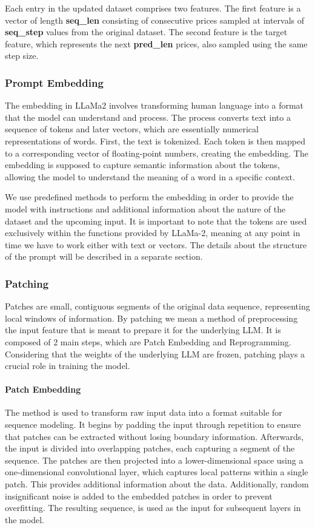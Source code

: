 Each entry in the updated dataset comprises two features. The first feature is a vector of length \textbf{seq\_len} consisting of consecutive prices sampled at intervals of \textbf{seq\_step} values from the original dataset. The second feature is the target feature, which represents the next \textbf{pred\_len} prices, also sampled using the same step size.

\subsubsection*{Prompt Embedding}
The embedding in LLaMa2 involves transforming human language into a format that the model can understand and process. The process converts text into a sequence of tokens and later vectors, which are essentially numerical representations of words. First, the text is tokenized. Each token is then mapped to a corresponding vector of floating-point numbers, creating the embedding. The embedding is supposed to capture semantic information about the tokens, allowing the model to understand the meaning of a word in a specific context.

We use predefined methods to perform the embedding in order to provide the model with instructions and additional information about the nature of the dataset and the upcoming input. It is important to note that the tokens are used exclusively within the functions provided by LLaMa-2, meaning at any point in time we have to work either with text or vectors.  The details about the structure of the prompt will be described in a separate section.
\subsubsection*{Patching}
Patches are small, contiguous segments of the original data sequence, representing local windows of information. By patching we mean a method of preprocessing the input feature that is meant to prepare it for the underlying LLM. It is composed of 2 main steps, which are Patch Embedding and Reprogramming. Considering that the weights of the underlying LLM are frozen, patching plays a crucial role in training the model.

\paragraph{Patch Embedding}
The method is used to transform raw input data into a format suitable for sequence modeling. It begins by padding the input through repetition to ensure that patches can be extracted without losing boundary information. Afterwards, the input is divided into overlapping patches, each capturing a segment of the sequence. The patches are then projected into a lower-dimensional space using a one-dimensional convolutional layer, which captures local patterns within a single patch. This provides additional information about the data. Additionally, random insignificant noise is added to the embedded patches in order to prevent overfitting. The resulting sequence, is used as the input for subsequent layers in the model.

